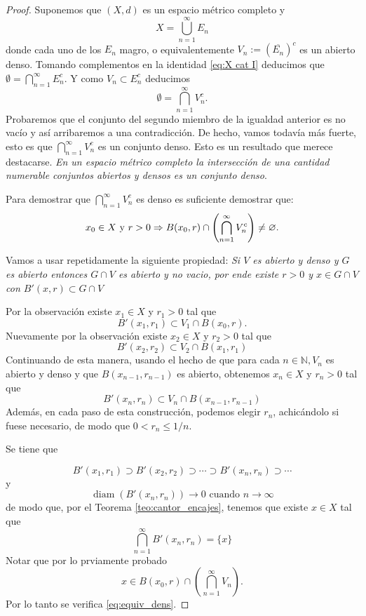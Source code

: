  \begin{proof}
  Suponemos   que $(X, d)$ es un espacio métrico completo y
\begin{equation}\label{eq:X cat I}
X=\bigcup_{n=1}^{\infty} E_{n}
\end{equation}
donde cada uno de los $E_{n}$ magro, o equivalentemente  $V_n:=\left(\overline{E_{n}}\right)^{c}$ es un abierto denso.  Tomando complementos en la identidad \eqref{eq:X cat I} deducimos que $\emptyset=\bigcap_{n=1}^\infty  E_{n}^c$. Y como $V_n\subset E_{n}^c$  deducimos
\begin{equation*}\label{eq:X cat I b}
 \emptyset= \bigcap_{n=1}^\infty  V_{n}^c.
\end{equation*}
Probaremos que el conjunto del segundo miembro de la igualdad anterior es no vacío y así arribaremos a una contradicción. De hecho, vamos todavía más fuerte, esto es que $\bigcap_{n=1}^\infty  V_{n}^c$ es un conjunto denso. Esto es un resultado que merece destacarse. \emph{En un espacio métrico completo la intersección de una cantidad numerable  conjuntos abiertos y densos es un conjunto denso}.

Para demostrar que $\bigcap_{n=1}^\infty  V_{n}^c$ es denso es suficiente demostrar que:
\begin{equation}\label{eq:equiv_dens}
  x_0\in X \hbox{ y }r>0 \Rightarrow B(x_0,r)\cap \left(\bigcap_{n=1}^\infty  V_{n}^c\right)\neq\emptyset. 
\end{equation}


\begin{observa}{}
Vamos a usar repetidamente la siguiente propiedad: \emph{Si $V$ es abierto y denso y $G$ es abierto entonces $G\cap V$ es abierto y no vacio, por ende existe $r>0$  y $x\in G\cap V$ con $B'(x,r)\subset G\cap V$}
\end{observa}


Por la observación existe $x_{1} \in X $ y $r_{1}>0$ tal que
$$
B'\left(x_{1}, r_1\right) \subset V_{1} \cap B\left(x_{0},r\right) .
$$
Nuevamente por la observación  existe $x_{2} \in X$ y $r_{2}>0$ tal que
$$
B'\left(x_{2},r_2\right) \subset V_{2} \cap B\left(x_{1},r_1\right)
$$
Continuando de esta manera, usando el hecho de que para cada $n \in \mathbb{N}, V_{n}$ es abierto y denso y que $B\left(x_{ n-1},r_{n-1}\right)$ es abierto, obtenemos $x_{n} \in X$ y $r_{n}>0$ tal que
$$
B'\left(x_{n},r_n\right) \subset V_{n} \cap B\left(x_{n -1},r_{n-1}\right)
$$
Además, en cada paso de esta construcción, podemos elegir $r_{n}$, achicándolo si fuese necesario, de modo  que $0<r_{n} \leq 1 / n$. 

Se tiene que

$$
B'\left(x_{1},r_1\right) \supset B'\left(x_{2},r_2\right) \supset \cdots \supset B'\left(x_{n},r_n\right) \supset \cdots
$$
y
$$
\operatorname{diam}\left(B'\left(x_{n},r_n\right)\right) \longrightarrow 0 \text { cuando } n \rightarrow \infty
$$
de modo que, por el Teorema \ref{teo:cantor_encajes}, tenemos que existe $x \in X$ tal que
$$
\bigcap_{n=1}^{\infty} B'\left(x_{n},r_n\right)=\{x\}
$$
Notar que por lo prviamente probado
$$
x \in B\left(x_{0},r\right)\cap\left( \bigcap_{n=1}^{\infty} V_{n}\right) .
$$
Por lo tanto se verifica \eqref{eq:equiv_dens}.
\end{proof}



